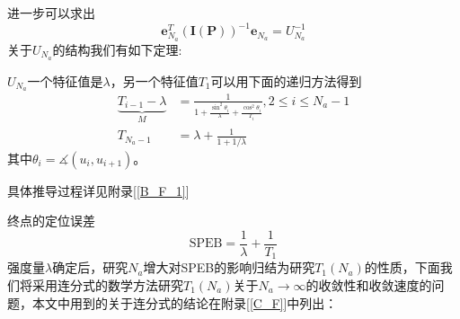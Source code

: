 进一步可以求出
\begin{equation}\label{eq:thomas_final}
\bm{e}_{N_a}^T(\bm{I}(\bm{P}))^{-1}\bm{e}_{N_a}=U_{N_a}^{-1}
\end{equation}
关于$U_{N_a}$的结构我们有如下定理:
\begin{theorem}
$U_{N_a}$一个特征值是$\lambda$，另一个特征值$T_1$可以用下面的递归方法得到
\begin{equation}\label{eq:recursive_efim}
\begin{split}
\underbrace{T_{i-1}-\lambda}_{M} & =\frac{1}{1+\frac{\sin^2\theta_i}{\lambda}+\frac{\cos^2\theta_i}{T_i}},2\leq i\leq N_a-1\\
T_{N_a-1} & = \lambda+\frac{1}{1+1/\lambda}
\end{split}
\end{equation}
其中$\theta_i=\measuredangle (u_i,u_{i+1})$。
\end{theorem}
具体推导过程详见附录[\ref{B_F_1}]
\begin{remark}
终点的定位误差
\begin{equation}\label{eq:final_speb}
\text{SPEB}=\frac{1}{\lambda}+\frac{1}{T_1}
\end{equation}
强度量$\lambda$确定后，研究$N_a$增大对SPEB的影响归结为研究$T_1(N_a)$的性质，下面我们将采用连分式的数学方法研究$T_1(N_a)$关于$N_a\to \infty$的收敛性和收敛速度的问题，本文中用到的关于连分式的结论在附录[\ref{C_F}]中列出\cite{ContinuedFraction}：
\end{remark}
